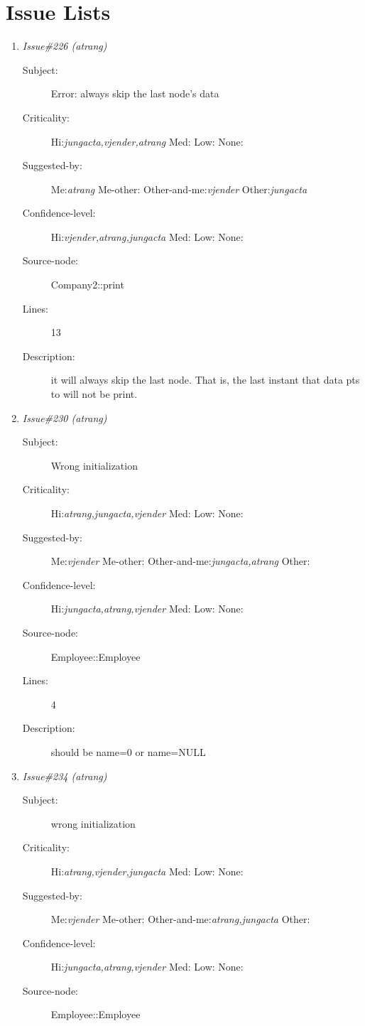 \section{Issue Lists}
\begin{enumerate}
\item {\it Issue\#226 (atrang)}
\begin{description}
\item [Subject:] Error: always skip the last node's data
\item [Criticality:] Hi:{\it jungacta,vjender,atrang} Med:{\it } Low:{\it } None:{\it }
\item [Suggested-by:] Me:{\it atrang} Me-other:{\it } Other-and-me:{\it vjender} Other:{\it jungacta}
\item [Confidence-level:] Hi:{\it vjender,atrang,jungacta} Med:{\it } Low:{\it } None:{\it }
\item [Source-node:] Company2::print

\item [Lines:] 13

\item [Description:] it will always skip the last node.  That is, the last instant that data pts
to will not be print.
\end{description}
\item {\it Issue\#230 (atrang)}
\begin{description}
\item [Subject:] Wrong initialization
\item [Criticality:] Hi:{\it atrang,jungacta,vjender} Med:{\it } Low:{\it } None:{\it }
\item [Suggested-by:] Me:{\it vjender} Me-other:{\it } Other-and-me:{\it jungacta,atrang} Other:{\it }
\item [Confidence-level:] Hi:{\it jungacta,atrang,vjender} Med:{\it } Low:{\it } None:{\it }
\item [Source-node:] Employee::Employee

\item [Lines:] 4

\item [Description:] should be name=0 or name=NULL
\end{description}
\item {\it Issue\#234 (atrang)}
\begin{description}
\item [Subject:] wrong initialization
\item [Criticality:] Hi:{\it atrang,vjender,jungacta} Med:{\it } Low:{\it } None:{\it }
\item [Suggested-by:] Me:{\it vjender} Me-other:{\it } Other-and-me:{\it atrang,jungacta} Other:{\it }
\item [Confidence-level:] Hi:{\it jungacta,atrang,vjender} Med:{\it } Low:{\it } None:{\it }
\item [Source-node:] Employee::Employee


\end{description}
\end{enumerate}
